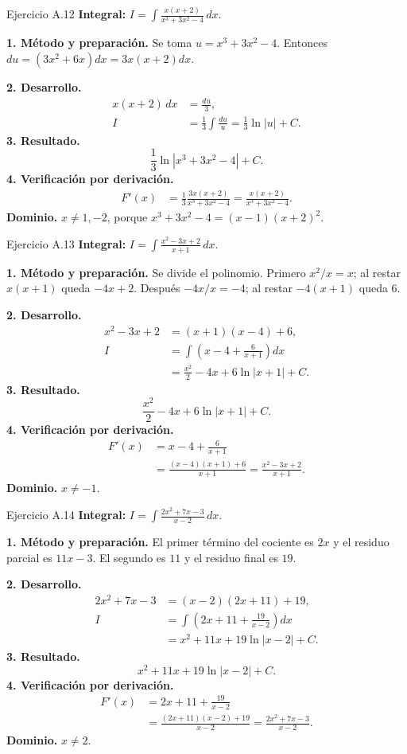 \begin{examplebox}{Ejercicio A.12}
\textbf{Integral:} $\displaystyle I=\int \frac{x(x+2)}{x^3+3x^2-4}\,dx$.

\textbf{1. Método y preparación.} Se toma $u=x^3+3x^2-4$. Entonces $du=(3x^2+6x)dx=3x(x+2)dx$.

\textbf{2. Desarrollo.}
\begin{align*}
x(x+2)\,dx&=\frac{du}{3},\\I&=\frac13\int\frac{du}{u}=\frac13\ln|u|+C.
\end{align*}
\textbf{3. Resultado.}
\[
\frac13\ln|x^3+3x^2-4|+C.
\]
\textbf{4. Verificación por derivación.}
\begin{align*}
F'(x)&=\frac13\frac{3x(x+2)}{x^3+3x^2-4}=\frac{x(x+2)}{x^3+3x^2-4}.
\end{align*}
\textbf{Dominio.} $x\ne1,-2$, porque $x^3+3x^2-4=(x-1)(x+2)^2$.
\end{examplebox}

\begin{examplebox}{Ejercicio A.13}
\textbf{Integral:} $\displaystyle I=\int \frac{x^2-3x+2}{x+1}\,dx$.

\textbf{1. Método y preparación.} Se divide el polinomio. Primero $x^2/x=x$; al restar $x(x+1)$ queda $-4x+2$. Después $-4x/x=-4$; al restar $-4(x+1)$ queda $6$.

\textbf{2. Desarrollo.}
\begin{align*}
x^2-3x+2&=(x+1)(x-4)+6,\\I&=\int\left(x-4+\frac6{x+1}\right)dx\\&=\frac{x^2}{2}-4x+6\ln|x+1|+C.
\end{align*}
\textbf{3. Resultado.}
\[
\frac{x^2}{2}-4x+6\ln|x+1|+C.
\]
\textbf{4. Verificación por derivación.}
\begin{align*}
F'(x)&=x-4+\frac6{x+1}\\&=\frac{(x-4)(x+1)+6}{x+1}=\frac{x^2-3x+2}{x+1}.
\end{align*}
\textbf{Dominio.} $x\ne-1$.
\end{examplebox}

\begin{examplebox}{Ejercicio A.14}
\textbf{Integral:} $\displaystyle I=\int \frac{2x^2+7x-3}{x-2}\,dx$.

\textbf{1. Método y preparación.} El primer término del cociente es $2x$ y el residuo parcial es $11x-3$. El segundo es $11$ y el residuo final es $19$.

\textbf{2. Desarrollo.}
\begin{align*}
2x^2+7x-3&=(x-2)(2x+11)+19,\\I&=\int\left(2x+11+\frac{19}{x-2}\right)dx\\&=x^2+11x+19\ln|x-2|+C.
\end{align*}
\textbf{3. Resultado.}
\[
x^2+11x+19\ln|x-2|+C.
\]
\textbf{4. Verificación por derivación.}
\begin{align*}
F'(x)&=2x+11+\frac{19}{x-2}\\&=\frac{(2x+11)(x-2)+19}{x-2}=\frac{2x^2+7x-3}{x-2}.
\end{align*}
\textbf{Dominio.} $x\ne2$.
\end{examplebox}


